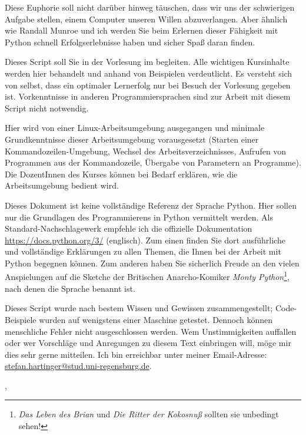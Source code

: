 Diese Euphorie soll nicht darüber hinweg täuschen, dass wir uns der schwierigen Aufgabe stellen, einem Computer unseren Willen abzuverlangen. Aber ähnlich wie Randall Munroe und ich werden Sie beim Erlernen dieser Fähigkeit mit Python schnell Erfolgserlebnisse haben und sicher Spaß daran finden.

Dieses Script soll Sie in der Vorlesung \emph{\myTitle} im \currentPeriod begleiten. Alle wichtigen Kursinhalte werden hier behandelt und anhand von Beispielen verdeutlicht. Es versteht sich von selbst, dass ein optimaler Lernerfolg nur bei Besuch der Vorlesung gegeben ist. Vorkenntnisse in anderen Programmiersprachen sind zur Arbeit mit diesem Script nicht notwendig.

Hier wird von einer Linux-Arbeits\-umgebung ausgegangen und minimale Grundkenntnisse dieser Arbeits\-umgebung vorausgesetzt (Starten einer Kommandozeilen-Umgebung, Wechsel des Arbeitsverzeichnisses, Aufrufen von Programmen aus der Kommandozeile, Übergabe von Parametern an Programme). Die DozentInnen des Kurses können bei Bedarf erklären, wie die Arbeitsumgebung bedient wird.

Dieses Dokument ist keine vollständige Referenz der Sprache Python. Hier sollen nur die Grundlagen des Programmierens in Python vermittelt werden. Als Standard-Nachschlagewerk empfehle ich die offizielle Dokumentation \url{https://docs.python.org/3/} (englisch). Zum einen finden Sie dort ausführliche und vollständige Erklärungen zu allen Themen, die Ihnen bei der Arbeit mit Python begegnen können. Zum anderen haben Sie sicherlich Freude an den vielen Anspielungen auf die Sketche der Britischen Anarcho-Komiker \emph{Monty Python}\footnote{\emph{Das Leben des Brian} und \emph{Die Ritter der Kokosnuß}\footnotemark \;
sollten sie unbedingt sehen!}, nach denen die Sprache benannt ist.

Dieses Script wurde nach bestem Wissen und Gewissen zusammengestellt; Code-Beispiele wurden auf wenigstens einer Maschine getestet. Dennoch können menschliche Fehler nicht ausgeschlossen werden. Wem Unstimmigkeiten auffallen oder wer Vorschläge und Anregungen zu diesem Text einbringen will, möge mir dies sehr gerne mitteilen. Ich bin erreichbar unter meiner Email-Adresse:\\ \url{stefan.hartinger@stud.uni-regensburg.de}.
\begin{flushright}
\myName, \myVersionTime
\end{flushright}